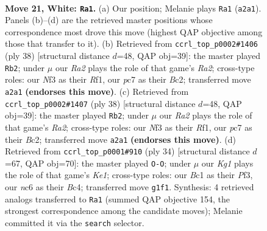 \documentclass[11pt]{article}
\begin{document}
\clearpage

\begin{figure}[p]\centering
\begin{subfigure}{0.46\textwidth}\centering
\resizebox{\linewidth}{!}{%
\newchessgame
\chessboard[
  setfen={r1b1kb1r/2p5/1pn3p1/p4p1p/3P4/1PPB1NP1/R4P1P/2BR2K1 w q - 12 21},
  showmover=false,
  pgfstyle=straightmove, color=movearrow, markmove={a2-a1}
]}
\caption{}
\end{subfigure}\hfill
\begin{subfigure}{0.46\textwidth}\centering
\resizebox{\linewidth}{!}{%
\newchessgame
\chessboard[
  setfen={r1b1k2r/pp3ppp/2p1p3/1P4B1/1b1P4/4PN2/R1B1nPPP/5R1K w kq - 3 20},
  showmover=false,
  pgfstyle=straightmove, color=movearrow, markmove={a2-b2}
]}
\caption{}
\end{subfigure}
\\[4pt]
\begin{subfigure}{0.46\textwidth}\centering
\resizebox{\linewidth}{!}{%
\newchessgame
\chessboard[
  setfen={r1b1k2r/pp3ppp/2p1p3/1P4B1/1b1P4/4PN2/R1B1nPPP/5R1K w kq - 3 20},
  showmover=false,
  pgfstyle=straightmove, color=movearrow, markmove={a2-b2}
]}
\caption{}
\end{subfigure}\hfill
\begin{subfigure}{0.46\textwidth}\centering
\resizebox{\linewidth}{!}{%
\newchessgame
\chessboard[
  setfen={r3kb1r/1p3pp1/p3pn2/4Nb2/2BB3p/2P2P1P/PP4P1/R3K2R w KQkq - 0 18},
  showmover=false,
  pgfstyle=straightmove, color=movearrow, markmove={e1-g1}
]}
\caption{}
\end{subfigure}
\caption{\textbf{Move 21, White: \texttt{Ra1}.} (a) Our position; Melanie plays \texttt{Ra1} (\texttt{a2a1}). Panels (b)--(d) are the retrieved master positions whose correspondence most drove this move (highest QAP objective among those that transfer to it). (b) Retrieved from \texttt{ccrl\_top\_p0002\#1406} (ply 38) [structural distance $d$=48, QAP obj=39]: the master played \texttt{Rb2}; under $\mu$ our \emph{Ra2} plays the role of that game's \emph{Ra2}; cross-type roles: our \emph{N}f3 as their \emph{R}f1, our \emph{p}c7 as their \emph{B}c2; transferred move \texttt{a2a1} \textbf{(endorses this move)}. (c) Retrieved from \texttt{ccrl\_top\_p0002\#1407} (ply 38) [structural distance $d$=48, QAP obj=39]: the master played \texttt{Rb2}; under $\mu$ our \emph{Ra2} plays the role of that game's \emph{Ra2}; cross-type roles: our \emph{N}f3 as their \emph{R}f1, our \emph{p}c7 as their \emph{B}c2; transferred move \texttt{a2a1} \textbf{(endorses this move)}. (d) Retrieved from \texttt{ccrl\_top\_p0001\#910} (ply 34) [structural distance $d$=67, QAP obj=70]: the master played \texttt{O-O}; under $\mu$ our \emph{Kg1} plays the role of that game's \emph{Ke1}; cross-type roles: our \emph{B}c1 as their \emph{P}f3, our \emph{n}c6 as their \emph{B}c4; transferred move \texttt{g1f1}. Synthesis: 4 retrieved analogs transferred to \texttt{Ra1} (summed QAP objective 154, the strongest correspondence among the candidate moves); Melanie committed it via the \texttt{search} selector.}
\label{fig:thought-m40}
\end{figure}
\end{document}
